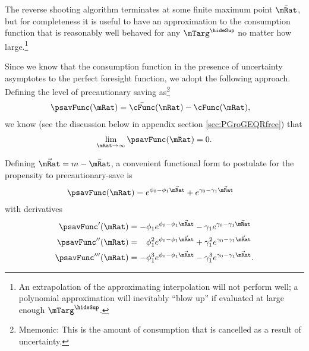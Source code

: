 \documentclass{\handout}
\begin{document}
The reverse shooting algorithm terminates at some finite maximum point $\bar\mRat$, but for completeness 
it is useful to have an approximation to the consumption function that is reasonably well behaved
for any $\mTarg^{\hideSup}$ no matter how large.\footnote{An extrapolation of the approximating interpolation will 
not perform well; a polynomial approximation will inevitably ``blow up'' if evaluated at large enough $\mTarg^{\hideSup}$.}

Since we know that the consumption function in the presence of uncertainty asymptotes to the 
perfect foresight function, we adopt the following approach.  Defining the level of precautionary
saving as\footnote{Mnemonic: This is the amount of consumption that is cancelled as a result of uncertainty.}
\begin{equation}\begin{gathered}\begin{aligned}
  \label{eq:pSavFunc}
  \psavFunc(\mRat) & =  \bar{\cFunc}(\mRat)-\cFunc(\mRat),
\end{aligned}\end{gathered}\end{equation}
we know (see the discussion below in appendix section \ref{sec:PGroGEQRfree}) that 
\begin{equation}\begin{gathered}\begin{aligned}
  \lim_{\mRat \rightarrow \infty} \psavFunc(\mRat) = 0
.
\end{aligned}\end{gathered}\end{equation}

Defining $\vec{\mRat}=m-\bar{\mRat}$, a convenient functional form to postulate for the
propensity to precautionary-save is
\begin{equation}\begin{gathered}\begin{aligned}
  \psavFunc(\mRat) & =  e^{\phi_{0}-\phi_{1} \vec{\mRat}}+e^{\gamma_{0}-\gamma_{1} \vec{\mRat}}
\end{aligned}\end{gathered}\end{equation}
with derivatives
\begin{equation}\begin{gathered}\begin{aligned}
    \psavFunc^{\prime}(\mRat) & =  -\phi_{1} e^{\phi_{0}-\phi_{1} \vec{\mRat}} - \gamma_{1} e^{\gamma_{0}-\gamma_{1} \vec{\mRat}}
\\  \psavFunc^{\prime\prime}(\mRat) & =  \phantom{-}\phi_{1}^{2} e^{\phi_{0}-\phi_{1} \vec{\mRat}} + \gamma_{1}^{2} e^{\gamma_{0}-\gamma_{1} \vec{\mRat}}
\\  \psavFunc^{\prime\prime\prime}(\mRat) & =  -\phi_{1}^{3} e^{\phi_{0}-\phi_{1} \vec{\mRat}} - \gamma_{1}^{3} e^{\gamma_{0}-\gamma_{1} \vec{\mRat}}
.
\end{aligned}\end{gathered}\end{equation}
\end{document}
